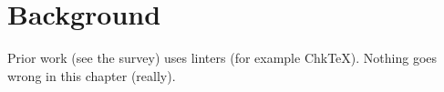\chapter{Background}
Prior work (see the survey) uses linters (for example ChkTeX).
Nothing goes wrong in this chapter (really).
